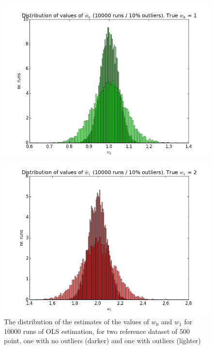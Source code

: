 \begin{figure}
\centering
\begin{minipage}{.5\textwidth}
  \centering
  \includegraphics[width=1.0\linewidth]{chapter_lad/ols_w0_with_and_without_outliers.png}
\end{minipage}%
\begin{minipage}{.5\textwidth}
  \centering
  \includegraphics[width=1.0\linewidth]{chapter_lad/ols_w1_with_and_without_outliers.png}
\end{minipage}
  \label{fig.ols_estimates_no_outliers}
  \caption{The distribution of the estimates of the values of $w_0$ and $w_1$ for 10000 runs of OLS estimation, for two reference dataset of 500 point, one with no outliers (darker) and one with outliers (lighter)}
\end{figure}


